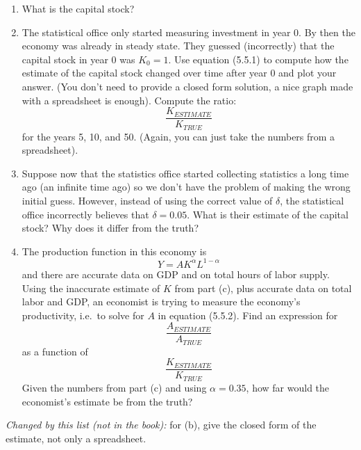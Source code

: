 \begin{enumerate}[label=(\alph*),leftmargin=2.2em,topsep=2pt,itemsep=1pt]
\item What is the capital stock?
\item The statistical office only started measuring investment in year 0. By then the economy was already in steady state. They
guessed (incorrectly) that the capital stock in year 0 was $K_0=1$. Use equation (5.5.1) to compute how the estimate of the capital
stock changed over time after year 0 and plot your answer. (You don't need to provide a closed form solution, a nice graph made
with a spreadsheet is enough). Compute the ratio:
\[
\frac{K_{ESTIMATE}}{K_{TRUE}}
\]
for the years 5, 10, and 50. (Again, you can just take the numbers from a spreadsheet).
\item Suppose now that the statistics office started collecting statistics a long time ago (an infinite time ago) so we don't have the
problem of making the wrong initial guess. However, instead of using the correct value of $\delta$, the statistical office incorrectly
believes that $\delta=0.05$. What is their estimate of the capital stock? Why does it differ from the truth?
\item The production function in this economy is
\[
Y=AK^{\alpha}L^{1-\alpha} \tag{5.5.2}
\]
and there are accurate data on GDP and on total hours of labor supply. Using the inaccurate estimate of $K$ from part (c), plus
accurate data on total labor and GDP, an economist is trying to measure the economy's productivity, i.e.\ to solve for $A$ in
equation (5.5.2). Find an expression for
\[
\frac{A_{ESTIMATE}}{A_{TRUE}}
\]
as a function of
\[
\frac{K_{ESTIMATE}}{K_{TRUE}}
\]
Given the numbers from part (c) and using $\alpha=0.35$, how far would the economist's estimate be from the truth?
\end{enumerate}
\noindent\textit{Changed by this list (not in the book):} for (b), give the closed form of the estimate, not only a spreadsheet.
\resolespaco
